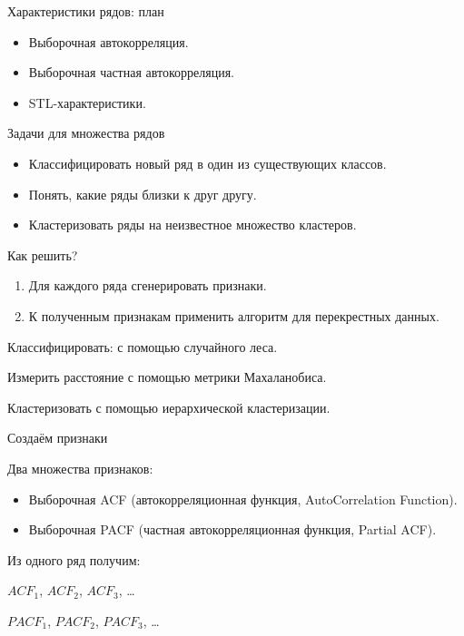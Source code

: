 
\begin{frame} %


\end{frame}



\begin{frame}{Характеристики рядов: план}
  \begin{itemize}[<+->]
    \item Выборочная автокорреляция. 
    \item Выборочная частная автокорреляция.
    \item STL-характеристики.
  \end{itemize}

\end{frame}

\begin{frame}{Задачи для множества рядов}
  \begin{itemize}
    \item Классифицировать новый ряд в один из существующих классов.
    \item Понять, какие ряды близки к друг другу.
    \item Кластеризовать ряды на неизвестное множество кластеров.
  \end{itemize}
  \pause
  \alert{Как решить?}
  \begin{enumerate}[<+->]
    \item Для каждого ряда сгенерировать \alert{признаки}. 
    \item К полученным признакам применить алгоритм для перекрестных данных.
 \end{enumerate}
 \pause
 Классифицировать: с помощью случайного леса.

 Измерить расстояние с помощью метрики Махаланобиса. 

 Кластеризовать с помощью иерархической кластеризации. 

\end{frame}


\begin{frame}{Создаём признаки}

Два \alert{множества} признаков:
\begin{itemize}[<+->]
  \item Выборочная ACF (\alert{автокорреляционная функция}, AutoCorrelation Function).
  \item Выборочная PACF (\alert{частная} автокорреляционная функция, Partial ACF).
\end{itemize}

\pause
Из \alert{одного} ряд получим:

$ACF_1$, $ACF_2$, $ACF_3$, \ldots

$PACF_1$, $PACF_2$, $PACF_3$, \ldots
\end{frame}


